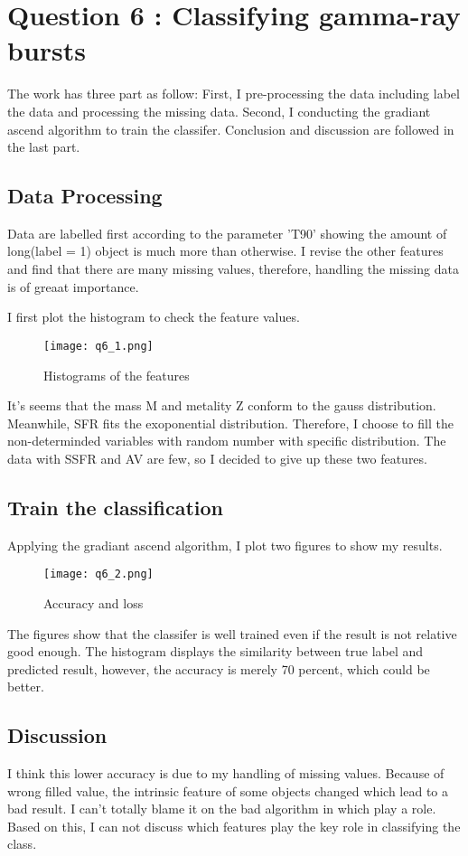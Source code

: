 \section{Question 6 : Classifying gamma-ray bursts}
The work has three part as follow: First, I pre-processing the data including label the data and processing the missing data. Second, I conducting the gradiant ascend algorithm to train the classifer. Conclusion and discussion are followed in the last part.
\subsection{Data Processing}
Data are labelled first according to the parameter 'T90' showing the amount of long(label = 1) object is much more than otherwise. I revise the other features and find that there are many missing values, therefore, handling the missing data is of greaat importance.

I first plot the histogram to check the feature values.
\begin{figure}[h!]
  \centering
  \texttt{[image: q6\_1.png]}
  \caption{Histograms of the features}
  \label{fig:hist_feature}
\end{figure}
It's seems that the mass M and metality Z conform to the gauss distribution. Meanwhile, SFR fits the exoponential distribution. Therefore, I choose to fill the non-determinded variables with random number with specific distribution. The data with SSFR and AV are few, so I decided to give up these two features.


\subsection{Train the classification}
Applying the gradiant ascend algorithm, I plot two figures to show my results.

\begin{figure}[h!]
  \centering
  \texttt{[image: q6\_2.png]}
  \caption{Accuracy and loss}
  \label{fig:hist_feature}
\end{figure}
The figures show that the classifer is well trained even if the result is not relative good enough. The histogram displays the similarity between true label and predicted result, however, the accuracy is merely 70 percent, which could be better.

\subsection{Discussion}
I think this lower accuracy is due to my handling of missing values. Because of wrong filled value, the intrinsic feature of some objects changed which lead to a bad result. I can't totally blame it on the bad algorithm in which play a role. Based on this, I can not discuss which features play the key role in classifying the class.

